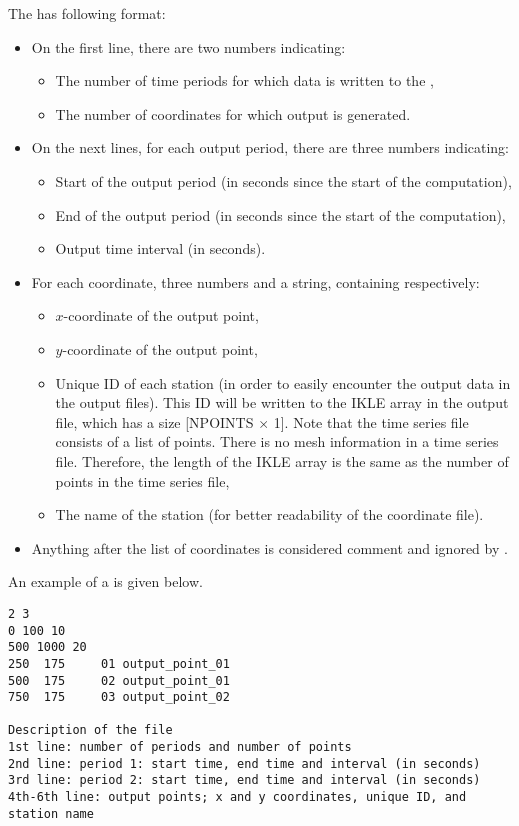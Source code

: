 The  has following format:
\begin {itemize}
\item On the first line, there are two numbers indicating:
\begin{itemize}
\item The number of time periods for which data is written to the
,
\item The number of coordinates for which output is generated.
\end {itemize}
\item On the next lines, for each output period, there are three numbers
indicating:
\begin{itemize}
\item Start of the output period (in seconds since the start of the computation),
\item End of the output period (in seconds since the start of the computation),
\item Output time interval (in seconds).
\end {itemize}
\item For each coordinate, three numbers and a string, containing respectively:
\begin{itemize}
\item $x$-coordinate of the output point,
\item $y$-coordinate of the output point,
\item Unique ID of each station (in order to easily encounter the output
data in the output files).
This ID will be written to the IKLE array in the output file, which has a size
[NPOINTS $\times$ 1].
Note that the time series file consists of a list of points.
There is no mesh information in a time series file.
Therefore, the length of the IKLE array is the same as the number of points in
the time series file,
\item The name of the station (for better readability of the coordinate file).
\end{itemize}
\item Anything after the list of coordinates is considered comment and ignored
by \tel.
\end {itemize}

An example of a  is given below.

\begin{verbatim}
2 3
0 100 10
500 1000 20
250  175     01 output_point_01
500  175     02 output_point_01
750  175     03 output_point_02

Description of the file
1st line: number of periods and number of points
2nd line: period 1: start time, end time and interval (in seconds)
3rd line: period 2: start time, end time and interval (in seconds)
4th-6th line: output points; x and y coordinates, unique ID, and station name
\end{verbatim}

